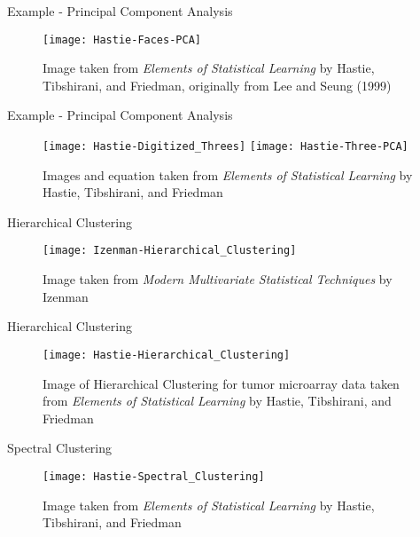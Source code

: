 \documentclass{beamer}
\begin{document}
\begin{frame}{Example - Principal Component Analysis}
\begin{center}
\begin{figure}[h!]
\texttt{[image: Hastie-Faces-PCA]}
\caption{Image taken from \emph{Elements of Statistical Learning} by Hastie, Tibshirani, and Friedman, originally from Lee and Seung (1999)}
\end{figure}
\end{center}
\end{frame}

\begin{frame}{Example - Principal Component Analysis}
\begin{center}
\begin{figure}
\texttt{[image: Hastie-Digitized\_Threes]}
\texttt{[image: Hastie-Three-PCA]}
\caption{Images and equation taken from \emph{Elements of Statistical Learning} by Hastie, Tibshirani, and Friedman}
\end{figure}
\end{center}
\end{frame}

\begin{frame}{Hierarchical Clustering}
\begin{center}
\begin{figure}
\texttt{[image: Izenman-Hierarchical\_Clustering]}
\caption{Image taken from \emph{Modern Multivariate Statistical Techniques} by Izenman}
\end{figure}
\end{center}
\end{frame}

\begin{frame}{Hierarchical Clustering}
\begin{center}
\begin{figure}
\texttt{[image: Hastie-Hierarchical\_Clustering]}
\caption{Image of Hierarchical Clustering for tumor microarray data taken from \emph{Elements of Statistical Learning} by Hastie, Tibshirani, and Friedman}
\end{figure}
\end{center}
\end{frame}

\begin{frame}{Spectral Clustering}
\begin{center}
\begin{figure}[h!]
\texttt{[image: Hastie-Spectral\_Clustering]}
\caption{Image taken from \emph{Elements of Statistical Learning} by Hastie, Tibshirani, and Friedman}
\end{figure}
\end{center}
\end{frame}
\end{document}
